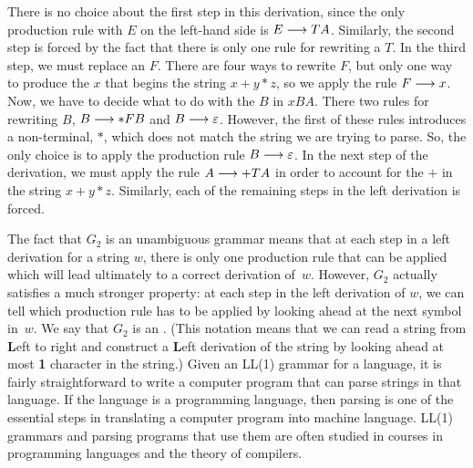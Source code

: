 There is no choice about the first step in this derivation, since the
only production rule with $E$ on the left-hand side is $E\longrightarrow TA$.
Similarly, the second step is forced by the fact that there is only
one rule for rewriting a $T$.  In the third step, we must replace
an $F$.  There are four ways to rewrite $F$, but only one way to produce
the $x$ that begins the string $x+y*z$, so we apply the rule $F\longrightarrow x$.
Now, we have to decide what to do with the $B$ in $xBA$.  There two rules
for rewriting $B$, $B\longrightarrow *FB$ and $B\longrightarrow\varepsilon$.  However,
the first of these rules introduces a non-terminal, $*$, which does not
match the string we are trying to parse.  So, the only choice is to
apply the production rule $B\longrightarrow\varepsilon$.  In the next step
of the derivation, we must apply the rule $A\longrightarrow +TA$ in order to 
account for the $+$ in the string $x+y*z$.  Similarly, each of the 
remaining steps in the left derivation is forced.

\medbreak

The fact that $G_2$ is an unambiguous grammar means that at each
step in a left derivation for a string $w$, there is only one production
rule that can be applied which will lead ultimately to a correct
derivation of~$w$.  However, $G_2$ actually satisfies a much stronger
property:  at each step in the left derivation of $w$, we can tell which
production rule has to be applied by looking ahead at the next
symbol in~$w$.  We say that $G_2$ is an .
(This notation means that we can read a string from \textbf{L}eft to
right and construct a \textbf{L}eft derivation of the string by
looking ahead at most \textbf{1} character in the string.)
Given an LL(1) grammar for a language, it is fairly straightforward
to write a computer program that can parse strings in that language.
If the language is a programming language, then parsing is one of the
essential steps in translating a computer program into machine language.
LL(1) grammars and parsing programs that use them are often studied
in courses in programming languages and the theory of compilers.

